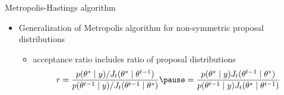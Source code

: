 \documentclass[finnish,english,t]{beamer}
\begin{document}
\begin{frame}{Metropolis-Hastings algorithm}

  \begin{itemize}
  \item Generalization of Metropolis algorithm for non-symmetric proposal distributions
    \begin{itemize}
    \item acceptance ratio includes ratio of proposal distributions
      \begin{equation*}
        r =
        \frac{p(\theta^{*} \mid y)/J_t(\theta^{*} \mid \theta^{t-1})}{p(\theta^{t-1} \mid y)/J_t(\theta^{t-1} \mid \theta^{*})} \pause =
        \frac{p(\theta^{*} \mid y)J_t(\theta^{t-1} \mid \theta^{*})}{p(\theta^{t-1} \mid y)J_t(\theta^{*} \mid \theta^{t-1})}
      \end{equation*}
    \end{itemize}
  \end{itemize}

\end{frame}




\end{document}

